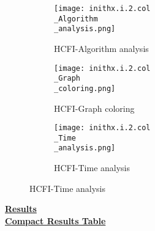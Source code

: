 \documentclass[10pt]{article}
\begin{document}
\graphicspath{{./Core1/Solutions/HCFI/inithx.i.2.col}}
\begin{figure}[H]
\begin{subfigure}{.33\textwidth}
  \centering
  \texttt{[image: inithx.i.2.col\\\_Algorithm\\\_analysis.png]}
  \caption{HCFI-Algorithm analysis}
   \label{fig:subfig1}
\end{subfigure}%
\begin{subfigure}{.33\textwidth}
  \centering
  \texttt{[image: inithx.i.2.col\\\_Graph\\\_coloring.png]}
  \caption{HCFI-Graph coloring}
  \label{fig:subfig2}
\end{subfigure}
\begin{subfigure}{.33\textwidth}
  \centering
  \texttt{[image: inithx.i.2.col\\\_Time\\\_analysis.png]}
  \caption{HCFI-Time analysis}
  \end{subfigure}
\end{figure}
\vspace{2cm}
\begin{center}
\hyperlink{page.8}{\textbf{Results}}\\
\vspace{0.5cm}
\hyperlink{page.71}{\textbf{Compact Results Table}}
\end{center}
\pagebreak
\end{document}
